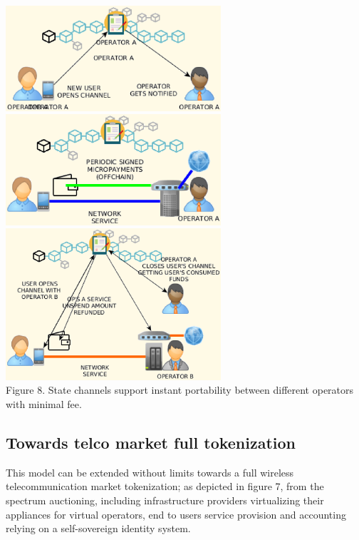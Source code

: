 \documentclass[12pt]{amsart}
\begin{document}
\begin{center}
  \includegraphics[keepaspectratio, width=0.6\textwidth]{images/bc5g/sc1-y.eps}
  \includegraphics[keepaspectratio, width=0.6\textwidth]{images/bc5g/sc2-y.eps}
  \includegraphics[keepaspectratio, width=0.6\textwidth]{images/bc5g/sc3-y.eps}
\\
Figure 8. State channels support instant portability
between different operators with minimal fee.
\\
\end{center}
\begin{multicols}{2}

  \subsection{Towards telco market full tokenization}

  \vspace{0.35cm}

  This model can be extended without limits towards a full wireless
  telecommunication market tokenization; as depicted in figure 7,
  from the spectrum auctioning, including infrastructure providers
  virtualizing their appliances for virtual operators, end to users
  service provision and accounting relying on a self-sovereign
  identity system.


\end{multicols}
\end{document}

